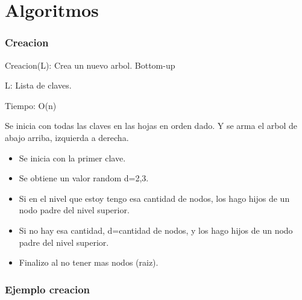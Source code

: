 \documentclass[10pt,handout]{beamer}
\begin{document}
\section{Algoritmos}
\begin{frame}
\frametitle{Creacion}

  Creacion(L): Crea un nuevo arbol. Bottom-up

  L: Lista de claves.

  Tiempo: O(n)

  Se inicia con todas las claves en las hojas en orden dado.
  Y se arma el arbol de abajo arriba, izquierda a derecha.

\begin{itemize}
  \item Se inicia con la primer clave.
  \item Se obtiene un valor random d={2,3}.
  \item Si en el nivel que estoy tengo esa cantidad de nodos, los hago hijos de
    un nodo padre del nivel superior.
  \item Si no hay esa cantidad, d=cantidad de nodos, y los hago hijos de un nodo
    padre del nivel superior.
  \item Finalizo al no tener mas nodos (raiz).
\end{itemize}

\end{frame}


\begin{frame}
\frametitle{Ejemplo creacion}

\pause
\pause
  \pause
  \pause
  \pause
  \pause

\end{frame}
\end{document}
